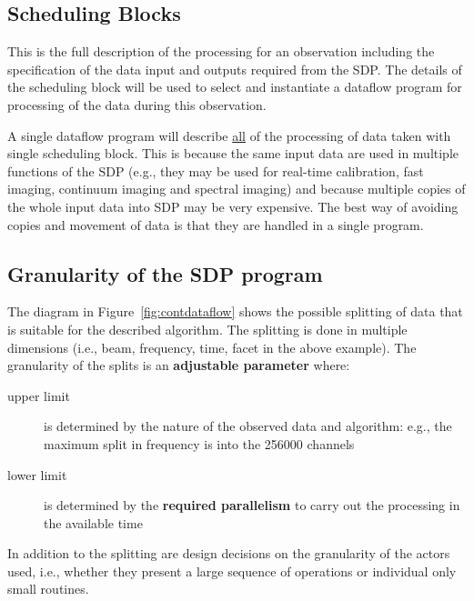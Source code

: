 \documentclass[11pt,a4paper]{article}
\begin{document}
\subsection{Scheduling Blocks}

This is the full description of the processing for an observation
including the specification of the data input and outputs required
from the SDP. The details of the scheduling block will be used to
select and instantiate a dataflow program for processing of the data
during this observation.

A single dataflow program will describe \underline{all} of the
processing of data taken with single scheduling block. This is because
the same input data are used in multiple functions of the SDP (e.g.,
they may be used for real-time calibration, fast imaging, continuum
imaging and spectral imaging) and because multiple copies of the whole
input data into SDP may be very expensive. The best way of avoiding
copies and movement of data is that they are handled in a single
program.

\subsection{Granularity of the SDP program}

The diagram in Figure~\ref{fig:contdataflow} shows the possible
splitting of data that is suitable for the described algorithm.  The
splitting is done in multiple dimensions (i.e., beam, frequency, time,
facet in the above example). The granularity of the splits is an {\bf
  adjustable parameter} where:
\begin{description}
\item[upper limit] is determined by the nature of the observed data
  and algorithm: e.g., the maximum split in frequency is into the
  256000 channels
\item[lower limit] is determined by the {\bf required parallelism} to
  carry out the processing in the available time
\end{description} 

In addition to the splitting are design decisions on the granularity
of the actors used, i.e., whether they present a large sequence of
operations or individual only small routines. 
\end{document}
